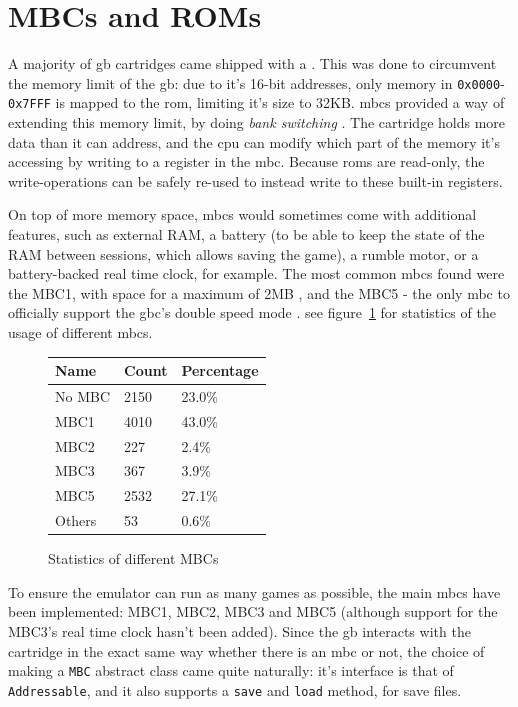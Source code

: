 \documentclass[11pt]{report}
\begin{document}
\section{MBCs and ROMs}

A majority of \gls{gb} cartridges came shipped with a . This was done to circumvent the memory limit of the \gls{gb}: due to it's 16-bit addresses, only memory in \texttt{0x0000}-\texttt{0x7FFF} is mapped to the \gls{rom}, limiting it's size to 32KB. \glspl{mbc} provided a way of extending this memory limit, by doing \textit{bank switching} \cite[MBCs]{pandoc}. The cartridge holds more data than it can address, and the \gls{cpu} can modify which part of the memory it's accessing by writing to a register in the \gls{mbc}. Because \glspl{rom} are read-only, the write-operations can be safely re-used to instead write to these built-in registers.

On top of more memory space, \glspl{mbc} would sometimes come with additional features, such as external RAM, a battery (to be able to keep the state of the RAM between sessions, which allows saving the game), a rumble motor, or a battery-backed real time clock, for example. The most common \glspl{mbc} found were the MBC1, with space for a maximum of 2MB \cite[MBC1]{pandoc}, and the MBC5 - the only \gls{mbc} to officially support the \gls{gbc}'s double speed mode \cite{mbc5_only_double}. see figure~\ref{fig:stats-mbc} for statistics of the usage of different \glspl{mbc}.

\begin{figure}[h]
    \centering
    \begin{tabular}{|l|l|l|}
    \hline
    \textbf{Name} & \textbf{Count} & \textbf{Percentage} \\ \hline
    No MBC & 2150 & 23.0\% \\ \hline
    MBC1   & 4010 & 43.0\% \\ \hline
    MBC2   &  227 &  2.4\% \\ \hline
    MBC3   &  367 &  3.9\% \\ \hline
    MBC5   & 2532 & 27.1\% \\ \hline
    Others &   53 &  0.6\% \\ \hline
    \end{tabular}
       \caption{Statistics of different MBCs \cite{gb_rom_db}}
    \label{fig:stats-mbc}
\end{figure}

To ensure the emulator can run as many games as possible, the main \glspl{mbc} have been implemented: MBC1, MBC2, MBC3 and MBC5 (although support for the MBC3's real time clock hasn't been added). Since the \gls{gb} interacts with the cartridge in the exact same way whether there is an \gls{mbc} or not, the choice of making a \texttt{MBC} abstract class came quite naturally: it's interface is that of \texttt{Addressable}, and it also supports a \texttt{save} and \texttt{load} method, for save files.
\end{document}
